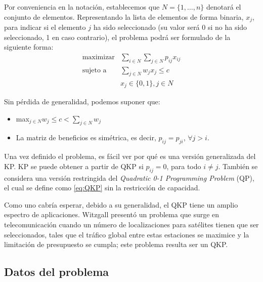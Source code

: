 Por conveniencia en la notación, establecemos que $N=\{1,\dots,n\}$ denotará el conjunto de elementos. 
Representando la lista de elementos de forma binaria, $x_j$, para indicar si el elemento $j$ ha sido seleccionado (su valor será 0 si no ha sido seleccionado, 1 en caso contrario), el problema podrá ser formulado de la siguiente forma:
\begin{equation}
\begin{aligned}
  \text{maximizar} & \sum_{i\in N}\sum_{j\in N}p_{ij}x_{ij} \\
  \text{sujeto a } & \sum_{j\in N}w_jx_j \leq c\\
  & x_j\in \{0,1\}, j \in N 
\end{aligned}
\label{eq:QKP}
\end{equation}

Sin pérdida de generalidad, podemos suponer que:
\begin{itemize}
	\item max$_{j\in N} w_j \leq c < \sum_{j\in N}w_j$
	\item La matriz de beneficios es simétrica, es decir, $p_{ij} = p_{ji}$, $\forall j > i$.
\end{itemize}

Una vez definido el problema, es fácil ver por qué es una versión generalizada del KP. 
KP se puede obtener a partir de QKP si $p_{ij} = 0$, para todo $i\neq j$. 
También se considera una versión restringida del \textit{Quadratic 0-1 Programming Problem} (QP), el cual se define como \ref{eq:QKP} sin la restricción de capacidad.

Como uno cabría esperar, debido a su generalidad, el QKP tiene un amplio espectro de aplicaciones. 
Witzgall %
presentó un problema que surge en telecomunicación cuando un número de localizaciones para satélites tienen que ser seleccionados, tales que el tráfico global entre estas estaciones se maximice y la limitación de presupuesto se cumpla; este problema resulta ser un QKP. 


\subsection{Datos del problema}

